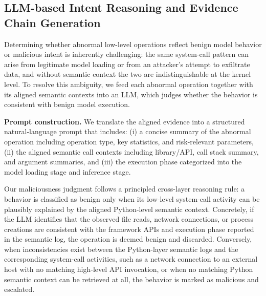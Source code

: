 \subsection{LLM-based Intent Reasoning and Evidence Chain Generation}
Determining whether abnormal low-level operations reflect benign model behavior or malicious intent is inherently challenging: the same system-call pattern can arise from legitimate model loading or from an attacker's attempt to exfiltrate data, and without semantic context the two are indistinguishable at the kernel level. To resolve this ambiguity, we feed each abnormal operation together with its aligned semantic contexts into an LLM, which judges whether the behavior is consistent with benign model execution.

\noindent \textbf{Prompt construction.} We translate the aligned evidence into a structured natural-language prompt that includes: (i) a concise summary of the abnormal operation including operation type, key statistics, and risk-relevant parameters, (ii) the aligned semantic call contexts including library/API, call stack summary, and argument summaries, and (iii) the execution phase categorized into the model loading stage and inference stage.

Our maliciousness judgment follows a principled cross-layer reasoning rule: a behavior is classified as benign only when its low-level system-call activity can be plausibly explained by the aligned Python-level semantic context. Concretely, if the LLM identifies that the observed file reads, network connections, or process creations are consistent with the framework APIs and execution phase reported in the semantic log, the operation is deemed benign and discarded. Conversely, when inconsistencies exist between the Python-layer semantic logs and the corresponding system-call activities, such as a network connection to an external host with no matching high-level API invocation, or when no matching Python semantic context can be retrieved at all, the behavior is marked as malicious and escalated.


